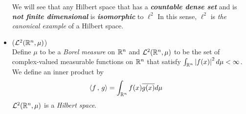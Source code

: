 \documentclass[11pt]{article}
\begin{document}
\begin{itemize}
\begin{example}
We will see that any Hilbert space that has a \emph{\textbf{countable dense set}} and is \emph{\textbf{not finite dimensional}} is \emph{\textbf{isomorphic}} to $\ell^2$ In this sense, $\ell^2$ is \emph{the canonical example} of a Hilbert space.
\end{example}

\item \begin{example} (${\mathcal L}^2({\mathbb R}^n, \mu)$)\\
Define $\mu$ to be a \emph{Borel measure} on ${\mathbb R}^n$ and ${\mathcal L}^2({\mathbb R}^n, \mu)$ to be the set of complex-valued measurable functions on ${\mathbb R}^n$ that satisfy $\int_{{\mathbb R}^n} \left\lvert f(x) \right\rvert^2 d\mu < \infty$.
We define an inner product by
\begin{align*}
\left\langle f\,,\, g \right\rangle &= \int_{{\mathbb R}^n}f(x)\overline{g(x)} d\mu
\end{align*} ${\mathcal L}^2({\mathbb R}^n, \mu)$ is a \emph{Hilbert space}.
\end{example}
\end{itemize}
\end{document}
